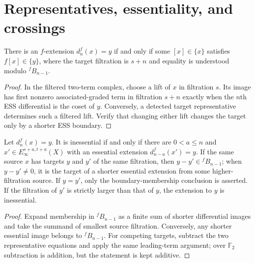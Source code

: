 \section{Representatives, essentiality, and crossings}

\begin{proposition}
  \label{prop:fextension-iff-detected}
  \notready
  There is an $f$-extension $d_n^f(x)=y$ if and only if some
  $[x]\in\{x\}$ satisfies $f[x]\in\{y\}$, where the target filtration is
  $s+n$ and equality is understood modulo ${}^fB_{n-1}$.
\end{proposition}

\begin{proof}
  In the filtered two-term complex, choose a lift of $x$ in filtration $s$.
  Its image has first nonzero associated-graded term in filtration $s+n$
  exactly when the $n$th ESS differential is the coset of $y$.  Conversely,
  a detected target representative determines such a filtered lift.  Verify
  that changing either lift changes the target only by a shorter ESS boundary.
\end{proof}

\begin{proposition}
  \label{prop:fextension-inessential-iff-higher}
  \notready
  Let $d_n^f(x)=y$.  It is inessential if and only if there are
  $0<a\le n$ and $x'\in E_\infty^{s+a,t+a}(X)$ with an essential extension
  $d_{n-a}^f(x')=y$.  If the same source $x$ has targets $y$ and $y'$ of the
  same filtration, then $y-y'\in{}^fB_{n-1}$; when $y-y'\ne0$, it is the
  target of a shorter essential extension from some higher-filtration source.
  If $y=y'$, only the boundary-membership conclusion is asserted.  If the
  filtration of $y'$ is strictly larger than that of $y$, the extension to
  $y$ is inessential.
\end{proposition}

\begin{proof}
  Expand membership in ${}^fB_{n-1}$ as a finite sum of shorter differential
  images and take the summand of smallest source filtration.  Conversely, any
  shorter essential image belongs to ${}^fB_{n-1}$.  For competing targets,
  subtract the two representative equations and apply the same leading-term
  argument; over $\mathbb F_2$ subtraction is addition, but the statement is
  kept additive.
\end{proof}

